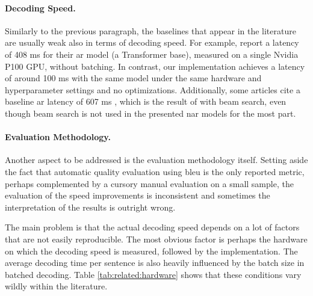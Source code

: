 \paragraph{Decoding Speed.} Similarly to the previous paragraph, the baselines
that appear in the literature are usually weak also in terms of decoding speed.
For example, \citet{gu2017nonautoregressive} report a latency of 408 ms for
their \ac{ar} model (a Transformer base), measured on a single Nvidia P100 GPU,
without batching. In contrast, our implementation achieves a latency of around
100 ms with the same model under the same hardware and hyperparameter settings
and no optimizations. Additionally, some articles cite a baseline \ac{ar}
latency of 607 ms \citep{wang-etal-2019-nonautoregressive,
  guo-etal-2020-jointly}, which is the result of
\citet{gu2017nonautoregressive} with beam search, even though beam search is
not used in the presented \ac{nar} models for the most part.

\paragraph{Evaluation Methodology.} Another aspect to be addressed is the
evaluation methodology itself. Setting aside the fact that automatic quality
evaluation using \acs{bleu} is the only reported metric, perhaps complemented
by a cursory manual evaluation on a small sample, the evaluation of the speed
improvements is inconsistent and sometimes the interpretation of the results is
outright wrong.

The main problem is that the actual decoding speed depends on a lot of factors
that are not easily reproducible. The most obvious factor is perhaps the
hardware on which the decoding speed is measured, followed by the
implementation. The average decoding time per sentence is also heavily
influenced by the batch size in batched decoding. Table
\ref{tab:related:hardware} shows that these conditions vary wildly within the
literature.

